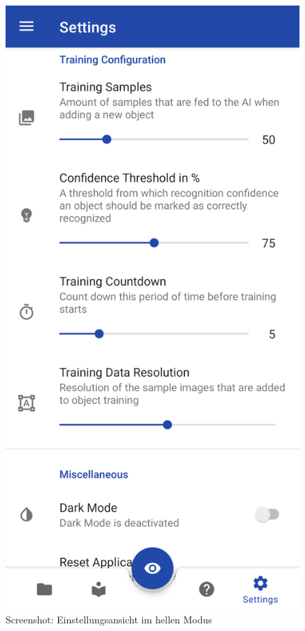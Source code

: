 \documentclass[oneside]{ausarbeitung}
\begin{document}
\begin{figure}[hptb]
	\centering
	\includegraphics[height=0.6\textheight]{images/screenshots/settings-light.png}
	\caption{Screenshot: Einstellungsansicht im hellen Modus}
	\label{fig:screenshot:settings-light}
\end{figure}
\end{document}
